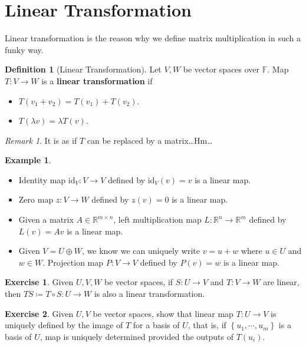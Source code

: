 \documentclass[12pt, a4paper]{article}
\newcommand{\R}{\mathbb{R}}
\theoremstyle{remark}
\newtheorem{remark}{Remark}
\theoremstyle{definition}
\newtheorem{definition}{Definition}
\newtheorem{example}{Example}
\newtheorem{exercise}{Exercise}
\numberwithin{equation}{section}
\numberwithin{definition}{section}
\numberwithin{example}{section}
\numberwithin{exercise}{section}
\numberwithin{remark}{section}
\numberwithin{figure}{section}
\begin{document}
\section{Linear Transformation}
Linear transformation is the reason why we define matrix multiplication in such a funky way.
\begin{definition}[Linear Transformation]
    Let $V, W$ be vector spaces over $\mathbb{F}$.
    Map $T: V \rightarrow W$ is a \textbf{linear transformation} if
    \begin{itemize}
        \item $T\left( v_1 + v_2 \right) = T\left( v_1 \right) + T\left( v_2 \right)$.
        \item $T\left( \lambda v \right) = \lambda T\left( v \right)$.
    \end{itemize}
\end{definition}
\begin{remark}
    It is as if $T$ can be replaced by a matrix\dots Hm\dots
\end{remark}
\begin{example}
    \begin{itemize}
        \item Identity map $\text{id}_V:V \rightarrow V$ defined by $\text{id}_V (v) = v$ is a linear map.
        \item Zero map $z:V \rightarrow W$ defined by $z(v) = 0$ is a linear map.
        \item Given a matrix $A \in \R^{m \times n}$, left multiplication map $L:\R^n \rightarrow \R^m$ defined by $L(v) = Av$ is a linear map.
        \item Given $V = U \oplus W$, we know we can uniquely write $v = u + w$ where $u \in U$ and $w \in W$. Projection map $P:V \rightarrow V$ defined by $P(v) = w$ is a linear map.
    \end{itemize}
\end{example}
\begin{exercise}
    Given $U, V, W$ be vector spaces, if $S:U \rightarrow V$ and $T:V \rightarrow W$ are linear,
    then $TS \coloneqq T \circ S:U \rightarrow W$ is also a linear transformation.
\end{exercise}
\begin{exercise}
    \label{ex: Linear Transform Determined By Image of Basis}
    Given $U, V$ be vector spaces, show that linear map $T:U \rightarrow V$ is uniquely defined by
    the image of $T$ for a basis of $U$, that is,
    if $\left\{ u_1, \cdots, u_m \right\}$ is a basis of $U$, 
    map is uniquely determined provided the outputs of $T\left( u_i \right)$.
\end{exercise}
\end{document}
